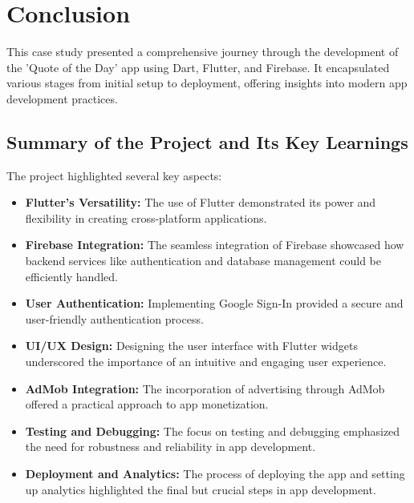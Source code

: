 \documentclass{book}
\begin{document}
\section{Conclusion}
This case study presented a comprehensive journey through the development of the 'Quote of the Day' app using Dart, Flutter, and Firebase. It encapsulated various stages from initial setup to deployment, offering insights into modern app development practices.

\subsection{Summary of the Project and Its Key Learnings}
The project highlighted several key aspects:
\begin{itemize}
    \item \textbf{Flutter's Versatility:} The use of Flutter demonstrated its power and flexibility in creating cross-platform applications.
    \item \textbf{Firebase Integration:} The seamless integration of Firebase showcased how backend services like authentication and database management could be efficiently handled.
    \item \textbf{User Authentication:} Implementing Google Sign-In provided a secure and user-friendly authentication process.
    \item \textbf{UI/UX Design:} Designing the user interface with Flutter widgets underscored the importance of an intuitive and engaging user experience.
    \item \textbf{AdMob Integration:} The incorporation of advertising through AdMob offered a practical approach to app monetization.
    \item \textbf{Testing and Debugging:} The focus on testing and debugging emphasized the need for robustness and reliability in app development.
    \item \textbf{Deployment and Analytics:} The process of deploying the app and setting up analytics highlighted the final but crucial steps in app development.
\end{itemize}
\end{document}
